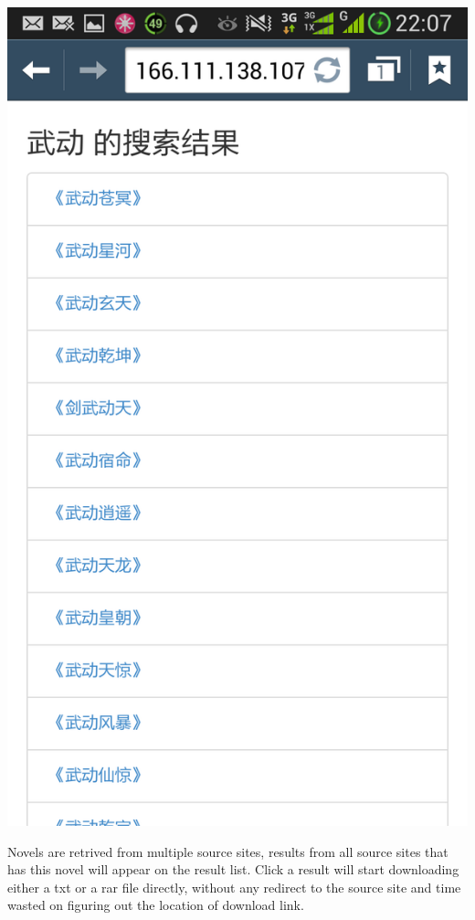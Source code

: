 \documentclass[portrait,final,a1paper,fontscale=0.277]{baposter}
\begin{document}
\begin{poster}
{{\parbox[c]{0.49\linewidth}{\includegraphics[width=\linewidth]{images/results.png}\\}
}
\vspace{0.5em}

Novels are retrived from multiple source sites, results from all source sites that has this novel will appear on the result list. Click a result will start downloading either a txt or a rar file directly, without any redirect to the source site and time wasted on figuring out the location of download link.
}


\end{poster}
\end{document}
